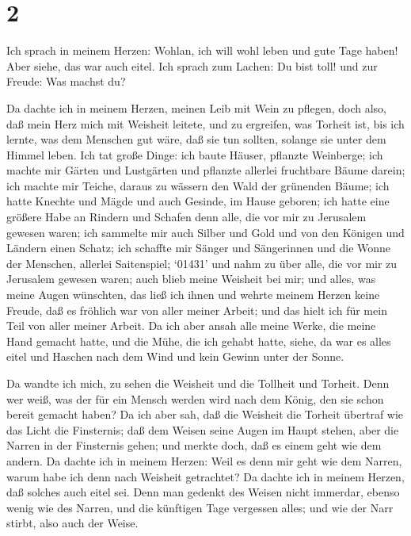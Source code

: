 \hypertarget{section-1}{%
\section{2}\label{section-1}}

 Ich sprach in meinem Herzen: Wohlan, ich will wohl leben
und gute Tage haben! Aber siehe, das war auch eitel.  Ich
sprach zum Lachen: Du bist toll! und zur Freude: Was machst du?

 Da dachte ich in meinem Herzen, meinen Leib mit Wein zu
pflegen, doch also, daß mein Herz mich mit Weisheit leitete, und zu
ergreifen, was Torheit ist, bis ich lernte, was dem Menschen gut wäre,
daß sie tun sollten, solange sie unter dem Himmel leben. 
Ich tat große Dinge: ich baute Häuser, pflanzte Weinberge; 
ich machte mir Gärten und Lustgärten und pflanzte allerlei fruchtbare
Bäume darein;  ich machte mir Teiche, daraus zu wässern den
Wald der grünenden Bäume;  ich hatte Knechte und Mägde und
auch Gesinde, im Hause geboren; ich hatte eine größere Habe an Rindern
und Schafen denn alle, die vor mir zu Jerusalem gewesen waren;
 ich sammelte mir auch Silber und Gold und von den Königen
und Ländern einen Schatz; ich schaffte mir Sänger und Sängerinnen und
die Wonne der Menschen, allerlei Saitenspiel;  `01431' und
nahm zu über alle, die vor mir zu Jerusalem gewesen waren; auch blieb
meine Weisheit bei mir;  und alles, was meine Augen
wünschten, das ließ ich ihnen und wehrte meinem Herzen keine Freude, daß
es fröhlich war von aller meiner Arbeit; und das hielt ich für mein Teil
von aller meiner Arbeit.  Da ich aber ansah alle meine
Werke, die meine Hand gemacht hatte, und die Mühe, die ich gehabt hatte,
siehe, da war es alles eitel und Haschen nach dem Wind und kein Gewinn
unter der Sonne.

 Da wandte ich mich, zu sehen die Weisheit und die Tollheit
und Torheit. Denn wer weiß, was der für ein Mensch werden wird nach dem
König, den sie schon bereit gemacht haben?  Da ich aber
sah, daß die Weisheit die Torheit übertraf wie das Licht die Finsternis;
 daß dem Weisen seine Augen im Haupt stehen, aber die
Narren in der Finsternis gehen; und merkte doch, daß es einem geht wie
dem andern.  Da dachte ich in meinem Herzen: Weil es denn
mir geht wie dem Narren, warum habe ich denn nach Weisheit getrachtet?
Da dachte ich in meinem Herzen, daß solches auch eitel sei.
 Denn man gedenkt des Weisen nicht immerdar, ebenso wenig
wie des Narren, und die künftigen Tage vergessen alles; und wie der Narr
stirbt, also auch der Weise.

